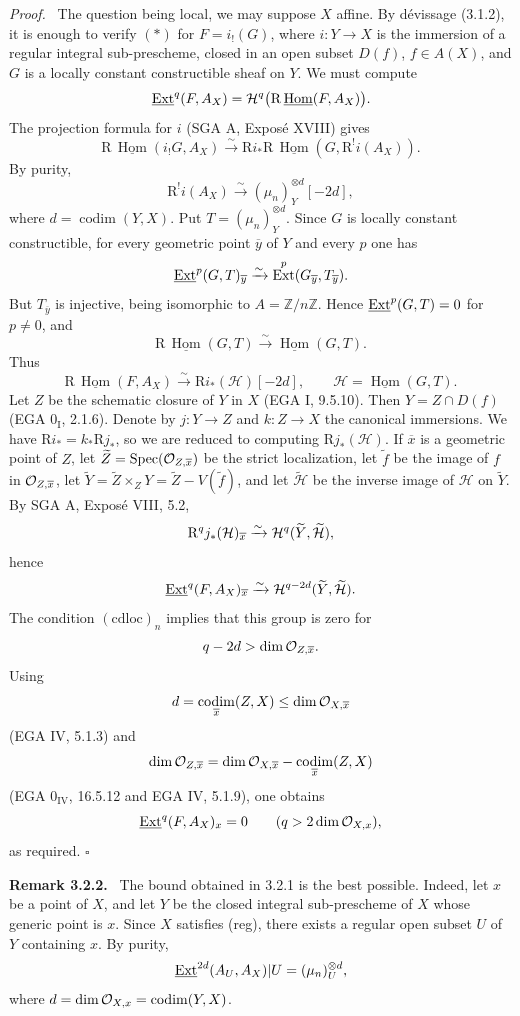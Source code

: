\documentclass[11pt]{article}
\theoremstyle{plain}
\theoremstyle{definition}
\theoremstyle{remark}
\newenvironment{statement}[1]{\par\medskip\noindent\textbf{#1.}\ }{\par\medskip}
\newenvironment{prooftext}{\par\noindent\textit{Proof.}\ }{\par\medskip}
\newcommand{\ZZ}{\mathbb Z}
\DeclareMathOperator{\Spec}{Spec}
\DeclareMathOperator{\Hom}{Hom}
\DeclareMathOperator{\Ext}{Ext}
\DeclareMathOperator{\codim}{codim}
\newcommand{\wt}[1]{\widetilde{#1}}
\newcommand{\ol}[1]{\overline{#1}}
\newcommand{\R}{\mathrm R}
\newcommand{\qedtext}{\hfill$\square$}
\providecommand{\codim}{\operatorname{codim}}
\begin{document}
\begin{prooftext}
The question being local, we may suppose $X$ affine. By dévissage (3.1.2), it is enough to verify $(*)$ for $F=i_!(G)$, where $i:Y\to X$ is the immersion of a regular integral sub-prescheme, closed in an open subset $D(f)$, $f\in A(X)$, and $G$ is a locally constant constructible sheaf on $Y$. We must compute
\[
   \uExt^q(F,A_X)=\Hh^q\bigl(\R\,\underline{\Hom}(F,A_X)\bigr).
\]
The projection formula for $i$ (SGA A, Exposé XVIII) gives
\[
 \R\,\underline{\Hom}(i_!G,A_X)
   \xrightarrow{\sim}
 \R i_*\R\,\underline{\Hom}(G,\R^!i(A_X)).
\]
By purity,
\[
   \R^!i(A_X)\xrightarrow{\sim}(\mu_n)^{\otimes d}_Y[-2d],
\]
where $d=\codim(Y,X)$. Put $T=(\mu_n)^{\otimes d}_Y$. Since $G$ is locally constant constructible, for every geometric point $\ol y$ of $Y$ and every $p$ one has
\[
   \uExt^p(G,T)_{\ol y}\xrightarrow{\sim}\Ext^p(G_{\ol y},T_{\ol y}).
\]
But $T_{\ol y}$ is injective, being isomorphic to $A=\ZZ/n\ZZ$. Hence $\underline{\operatorname{Ext}}^p(G,T)=0$ for $p\ne0$, and
\[
   \R\,\underline{\Hom}(G,T)\xrightarrow{\sim}\underline{\Hom}(G,T).
\]
Thus
\[
   \R\,\underline{\Hom}(F,A_X)
      \xrightarrow{\sim} \R i_*(\mathcal H)[-2d],
   \qquad \mathcal H=\underline{\Hom}(G,T).
\]
Let $Z$ be the schematic closure of $Y$ in $X$ (EGA I, 9.5.10). Then $Y=Z\cap D(f)$ (EGA $0_{\mathrm I}$, 2.1.6). Denote by $j:Y\to Z$ and $k:Z\to X$ the canonical immersions. We have $\R i_*=k_*\R j_*$, so we are reduced to computing $\R j_*(\mathcal H)$. If $\ol x$ is a geometric point of $Z$, let $\wt Z=\Spec(\cO_{Z,\ol x})$ be the strict localization, let $\wt f$ be the image of $f$ in $\cO_{Z,\ol x}$, let $\wt Y=\wt Z\times_ZY=\wt Z-V(\wt f)$, and let $\wt{\mathcal H}$ be the inverse image of $\mathcal H$ on $\wt Y$. By SGA A, Exposé VIII, 5.2,
\[
   \R^qj_*(\mathcal H)_{\ol x}
      \xrightarrow{\sim}\Hh^q(\wt Y,\wt{\mathcal H}),
\]
hence
\[
   \uExt^q(F,A_X)_{\ol x}
      \xrightarrow{\sim}\Hh^{q-2d}(\wt Y,\wt{\mathcal H}).
\]
The condition $(\mathrm{cdloc})_n$ implies that this group is zero for
\[
   q-2d>\dim\cO_{Z,\ol x}.
\]
Using
\[
   d=\codim_{\ol x}(Z,X)\le\dim\cO_{X,\ol x}
\]
(EGA IV, 5.1.3) and
\[
   \dim\cO_{Z,\ol x}
     =\dim\cO_{X,\ol x}-\codim_{\ol x}(Z,X)
\]
(EGA $0_{\mathrm{IV}}$, 16.5.12 and EGA IV, 5.1.9), one obtains
\[
   \underline{\operatorname{Ext}}^q(F,A_X)_x=0\qquad(q>2\dim\mathcal O_{X,x}),
\]
as required. \qedtext
\end{prooftext}

\begin{statement}{Remark 3.2.2}
The bound obtained in 3.2.1 is the best possible. Indeed, let $x$ be a point of $X$, and let $Y$ be the closed integral sub-prescheme of $X$ whose generic point is $x$. Since $X$ satisfies (reg), there exists a regular open subset $U$ of $Y$ containing $x$. By purity,
\[
   \underline{\operatorname{Ext}}^{2d}(A_U,A_X)|U=(\mu_n)^{\otimes d}_U,
\]
where $d=\dim\cO_{X,x}=\codim(Y,X)$.
\end{statement}
\end{document}
